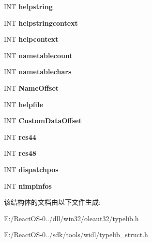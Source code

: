 \begin{DoxyCompactItemize}
\item 
\mbox{\label{structtag_m_s_f_t___header_a37f375a2c70e31cde9d90f4660cda500}} 
I\+NT {\bfseries helpstring}
\item 
\mbox{\label{structtag_m_s_f_t___header_a1b58a3f14af791bff0a7461b692ec789}} 
I\+NT {\bfseries helpstringcontext}
\item 
\mbox{\label{structtag_m_s_f_t___header_a222207fa2521df9a6cf116beb83bea38}} 
I\+NT {\bfseries helpcontext}
\item 
\mbox{\label{structtag_m_s_f_t___header_a04c103472baa1f59b1717194e1b4d5f5}} 
I\+NT {\bfseries nametablecount}
\item 
\mbox{\label{structtag_m_s_f_t___header_a17c4ab842a37f92f2143ddccbac52f71}} 
I\+NT {\bfseries nametablechars}
\item 
\mbox{\label{structtag_m_s_f_t___header_a69016dcb4156c1f9c2313381199c4e9b}} 
I\+NT {\bfseries Name\+Offset}
\item 
\mbox{\label{structtag_m_s_f_t___header_aaa718419d926ca1c4ee5e1bc13328e8b}} 
I\+NT {\bfseries helpfile}
\item 
\mbox{\label{structtag_m_s_f_t___header_ac6ef56edd168dcd41bc8a10b918fd431}} 
I\+NT {\bfseries Custom\+Data\+Offset}
\item 
\mbox{\label{structtag_m_s_f_t___header_ae24afd9dbb0809afa7798349c1afec85}} 
I\+NT {\bfseries res44}
\item 
\mbox{\label{structtag_m_s_f_t___header_aa5eb7a78143c352d59786791e29acc0e}} 
I\+NT {\bfseries res48}
\item 
\mbox{\label{structtag_m_s_f_t___header_a9d31c6ec61e28b432b6d69db73f85898}} 
I\+NT {\bfseries dispatchpos}
\item 
\mbox{\label{structtag_m_s_f_t___header_a6442b013349dd06866dbd89fb1a9d4ee}} 
I\+NT {\bfseries nimpinfos}
\end{DoxyCompactItemize}


该结构体的文档由以下文件生成\+:\begin{DoxyCompactItemize}
\item 
E\+:/\+React\+O\+S-\/0../dll/win32/oleaut32/typelib.\+h\item 
E\+:/\+React\+O\+S-\/0../sdk/tools/widl/typelib\+\_\+struct.\+h\end{DoxyCompactItemize}
